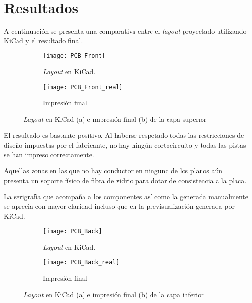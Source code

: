 \clearpage

\section{Resultados\label{sec:PCB_Resultados}}

A continuación se presenta una comparativa entre el \textit{layout} proyectado utilizando KiCad y el resultado final.

\begin{figure}[h]
  \begin{subfigure}[b]{8cm}
   	\centering
    \texttt{[image: PCB\_Front]}
    \caption{\textit{Layout} en KiCad.}
    \label{fig:PCB_Front}
  \end{subfigure}
  \hfill
  \begin{subfigure}[b]{8cm}
  	\centering
    \texttt{[image: PCB\_Front\_real]}
    \caption{Impresión final}
    \label{fig:PCB_Front_real}
  \end{subfigure}
  \caption{\textit{Layout} en KiCad (a) e impresión final (b) de la capa superior}
  \label{fig:PCB_Front_completa}
\end{figure}

El resultado es bastante positivo. Al haberse respetado todas las restricciones de diseño impuestas por el fabricante, no hay ningún cortocircuito y todas las pistas se han impreso correctamente.

Aquellas zonas en las que no hay conductor en ninguno de los planos aún presenta un soporte físico de fibra de vidrio para dotar de consistencia a la placa.

La serigrafía que acompaña a los componentes así como la generada manualmente se aprecia con mayor claridad incluso que en la previsualización generada por KiCad.

\clearpage

\begin{figure}[h]
  \begin{subfigure}[b]{8cm}
   	\centering
    \texttt{[image: PCB\_Back]}
    \caption{\textit{Layout} en KiCad.}
    \label{fig:PCB_Back}
  \end{subfigure}
  \hfill
  \begin{subfigure}[b]{8cm}
  	\centering
    \texttt{[image: PCB\_Back\_real]}
    \caption{Impresión final}
    \label{fig:PCB_Back_real}
  \end{subfigure}
  \caption{\textit{Layout} en KiCad (a) e impresión final (b) de la capa inferior}
  \label{fig:PCB_Back_completa}
\end{figure}

